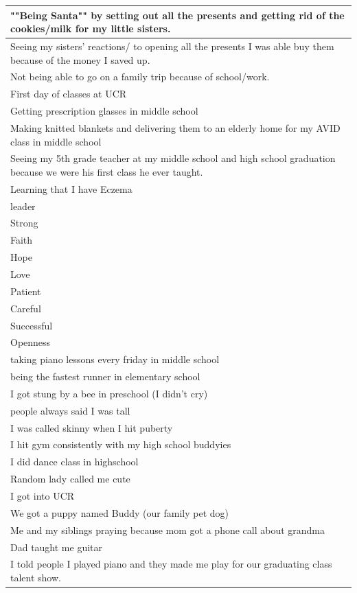 \documentclass[
  .7em,
  letterpaper,
  DIV=11,
  numbers=noendperiod]{scrartcl}
\begin{document}
\begin{table}
\begin{tabular}{l}
\hline
""Being Santa"" by setting out all the presents and getting rid of the cookies/milk for my little sisters.\\
\hline
Seeing my sisters' reactions/ to opening all the presents I was able buy them because of the money I saved up.\\
\hline
Not being able to go on a family trip because of school/work.\\
\hline
First day of classes at UCR\\
\hline
Getting prescription glasses in middle school\\
\hline
Making knitted blankets and delivering them to an elderly home for my AVID class in middle school\\
\hline
Seeing my 5th grade teacher at my middle school and high school graduation because we were his first class he ever taught.\\
\hline
Learning that I have Eczema\\
\hline
leader\\
\hline
Strong\\
\hline
Faith\\
\hline
Hope\\
\hline
Love\\
\hline
Patient\\
\hline
Careful\\
\hline
Successful\\
\hline
Openness\\
\hline
taking piano lessons every friday in middle school\\
\hline
being the fastest runner in elementary school\\
\hline
I got stung by a bee in preschool (I didn't cry)\\
\hline
people always said I was tall\\
\hline
I was called skinny when I hit puberty\\
\hline
I hit gym consistently with my high school buddyies\\
\hline
I did dance class in highschool\\
\hline
Random lady called me cute\\
\hline
I got into UCR\\
\hline
We got a puppy named Buddy (our family pet dog)\\
\hline
Me and my siblings praying because mom got a phone call about grandma\\
\hline
Dad taught me guitar\\
\hline
I told people I played piano and they made me play for our graduating class talent show.\\

\end{tabular}
\end{table}
\end{document}
